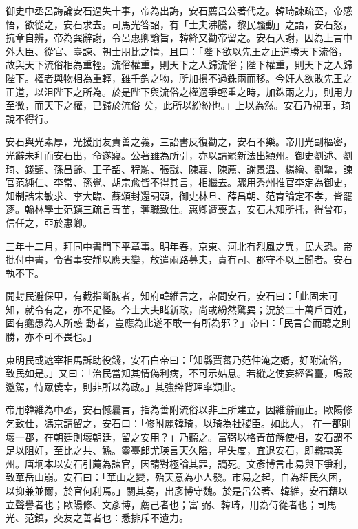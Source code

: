 \begin{pinyinscope}
 御史中丞呂誨論安石過失十事，帝為出誨，安石薦呂公著代之。韓琦諫疏至，帝感悟，欲從之，安石求去。司馬光答詔，有「士夫沸騰，黎民騷動」之語，安石怒，
 抗章自辨，帝為巽辭謝，令呂惠卿諭旨，韓絳又勸帝留之。安石入謝，因為上言中外大臣、從官、臺諫、朝士朋比之情，且曰：「陛下欲以先王之正道勝天下流俗，故與天下流俗相為重輕。流俗權重，則天下之人歸流俗；陛下權重，則天下之人歸陛下。權者與物相為重輕，雖千鈞之物，所加損不過銖兩而移。今奸人欲敗先王之正道，以沮陛下之所為。於是陛下與流俗之權適爭輕重之時，加銖兩之力，則用力至微，而天下之權，已歸於流俗
 矣，此所以紛紛也。」上以為然。安石乃視事，琦說不得行。



 安石與光素厚，光援朋友責善之義，三詒書反復勸之，安石不樂。帝用光副樞密，光辭未拜而安石出，命遂寢。公著雖為所引，亦以請罷新法出穎州。御史劉述、劉琦、錢顗、孫昌齡、王子韶、程顥、張戩、陳襄、陳薦、謝景溫、楊繪、劉摯，諫官范純仁、李常、孫覺、胡宗愈皆不得其言，相繼去。驟用秀州推官李定為御史，知制誥宋敏求、李大臨、蘇頌封還詞頭，御史林旦、薛昌朝、范育論定不孝，皆罷
 逐。翰林學士范鎮三疏言青苗，奪職致仕。惠卿遭喪去，安石未知所托，得曾布，信任之，亞於惠卿。



 三年十二月，拜同中書門下平章事。明年春，京東、河北有烈風之異，民大恐。帝批付中書，令省事安靜以應天變，放遣兩路募夫，責有司、郡守不以上聞者。安石執不下。



 開封民避保甲，有截指斷腕者，知府韓維言之，帝問安石，安石曰：「此固未可知，就令有之，亦不足怪。今士大夫睹新政，尚或紛然驚異；況於二十萬戶百姓，固有蠢愚為人所惑
 動者，豈應為此遂不敢一有所為邪？」帝曰：「民言合而聽之則勝，亦不可不畏也。」



 東明民或遮宰相馬訴助役錢，安石白帝曰：「知縣賈蕃乃范仲淹之婿，好附流俗，致民如是。」又曰：「治民當知其情偽利病，不可示姑息。若縱之使妄經省臺，鳴鼓邀駕，恃眾僥幸，則非所以為政。」其強辯背理率類此。



 帝用韓維為中丞，安石憾曩言，指為善附流俗以非上所建立，因維辭而止。歐陽修乞致仕，馮京請留之，安石曰：「修附麗韓琦，以琦為社稷臣。如此人，
 在一郡則壞一郡，在朝廷則壞朝廷，留之安用？」乃聽之。富弼以格青苗解使相，安石謂不足以阻奸，至比之共、鯀。靈臺郎尤瑛言天久陰，星失度，宜退安石，即黥隸英州。唐坰本以安石引薦為諫官，因請對極論其罪，謫死。文彥博言市易與下爭利，致華岳山崩。安石曰：「華山之變，殆天意為小人發。市易之起，自為細民久困，以抑兼並爾，於官何利焉。」閼其奏，出彥博守魏。於是呂公著、韓維，安石藉以立聲譽者也；歐陽修、文彥博，薦己者也；富
 弼、韓琦，用為侍從者也；司馬光、范鎮，交友之善者也：悉排斥不遺力。




\end{pinyinscope}
